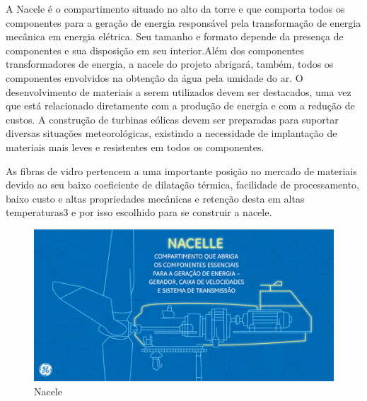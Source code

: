 A Nacele é o compartimento situado no alto da torre e que comporta todos os componentes para a geração de energia responsável pela transformação de energia mecânica em energia elétrica. Seu tamanho e formato depende da presença de componentes e sua disposição em seu interior\cite{custodio2013}.Além dos componentes transformadores de energia, a nacele do projeto abrigará, também, todos os componentes envolvidos na obtenção da água pela umidade do ar. O desenvolvimento de materiais a serem utilizados devem ser destacados, uma vez que está relacionado diretamente com a produção de energia e com a redução de custos. A construção de turbinas eólicas devem ser preparadas para suportar diversas situações meteorológicas, existindo a necessidade de implantação de materiais mais leves e resistentes em todos os componentes. 	
	  
	As fibras de vidro pertencem a uma importante posição no mercado de materiais devido ao seu baixo coeficiente de dilatação térmica, facilidade de processamento, baixo custo e altas propriedades mecânicas e retenção desta em altas temperaturas3 e por isso escolhido para se construir a nacele.
	
	\begin{figure}[!htbp]
	 \centering
	  \includegraphics[scale=0.5]{editaveis/figuras/nacele}
	  \caption[nacele]{Nacele\footnotemark}
	  \label{nacele}
	\end{figure}
